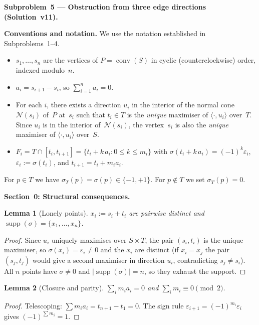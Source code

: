 \documentclass{article}
\newtheorem{lemma}{Lemma}
\begin{document}
\textbf{Subproblem~5 --- Obstruction from three edge directions (Solution~v11).}

\medskip
\noindent\textbf{Conventions and notation.}
We use the notation established in Subproblems~1--4.
\begin{itemize}
  \item $s_1,\dots,s_n$ are the vertices of $P=\operatorname{conv}(S)$ in cyclic
        (counterclockwise) order, indexed modulo~$n$.
  \item $a_i = s_{i+1}-s_i$, so $\sum_{i=1}^n a_i = 0$.
  \item For each $i$, there exists a direction $u_i$ in the interior of the normal cone
        $\mathcal{N}(s_i)$ of~$P$ at~$s_i$ such that $t_i\in T$ is the \emph{unique}
        maximiser of $\langle\cdot,u_i\rangle$ over~$T$.
        Since $u_i$ is in the interior of~$\mathcal{N}(s_i)$, the vertex~$s_i$ is
        also the \emph{unique} maximiser of $\langle\cdot,u_i\rangle$ over~$S$.
  \item $F_i = T\cap[t_i,t_{i+1}]=\{t_i+k\,a_i:0\le k\le m_i\}$ with
        $\sigma(t_i+k\,a_i)=(-1)^k\varepsilon_i$, $\varepsilon_i:=\sigma(t_i)$,
        and $t_{i+1}=t_i+m_i a_i$.
\end{itemize}
For $p\in T$ we have $\sigma_T(p)=\sigma(p)\in\{-1,+1\}$.
For $p\notin T$ we set $\sigma_T(p)=0$.

\bigskip
\noindent\textbf{Section~0: Structural consequences.}

\begin{lemma}[Lonely points]\label{lem:lonely}
$x_i:=s_i+t_i$ are pairwise distinct and
$\operatorname{supp}(\sigma)=\{x_1,\dots,x_n\}$.
\end{lemma}
\begin{proof}
Since $u_i$ uniquely maximises over $S\times T$, the pair $(s_i,t_i)$ is the unique maximiser,
so $\sigma(x_i)=\varepsilon_i\ne 0$ and the $x_i$ are distinct (if $x_i=x_j$ the pair
$(s_j,t_j)$ would give a second maximiser in direction $u_i$, contradicting $s_j\ne s_i$).
All $n$ points have $\sigma\ne 0$ and $|\operatorname{supp}(\sigma)|=n$, so they
exhaust the support.
\end{proof}

\begin{lemma}[Closure and parity]\label{lem:closure}
$\sum_{i}m_i a_i=0$ and $\sum_i m_i\equiv 0\pmod{2}$.
\end{lemma}
\begin{proof}
Telescoping: $\sum m_i a_i=t_{n+1}-t_1=0$.
The sign rule $\varepsilon_{i+1}=(-1)^{m_i}\varepsilon_i$ gives $(-1)^{\sum m_i}=1$.
\end{proof}
\end{document}
